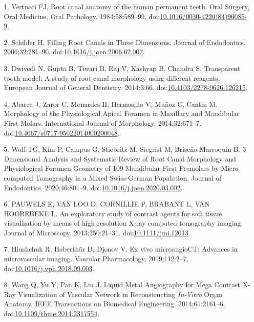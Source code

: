 \documentclass[
  american,
]{article}
\newenvironment{cslreferences}%
  {}%
  {\par}
\begin{document}
\hypertarget{refs}{}
\begin{cslreferences}
\leavevmode\hypertarget{ref-q3HKadWY}{}%
1. Vertucci FJ. Root canal anatomy of the human permanent teeth. Oral Surgery, Oral Medicine, Oral Pathology. 1984;58:589--99. doi:\href{https://doi.org/10.1016/0030-4220(84)90085-9}{10.1016/0030-4220(84)90085-9}.

\leavevmode\hypertarget{ref-AHVImOFB}{}%
2. Schilder H. Filling Root Canals in Three Dimensions. Journal of Endodontics. 2006;32:281--90. doi:\href{https://doi.org/10.1016/j.joen.2006.02.007}{10.1016/j.joen.2006.02.007}.

\leavevmode\hypertarget{ref-11Kln4Lf0}{}%
3. Dwivedi N, Gupta B, Tiwari B, Raj V, Kashyap B, Chandra S. Transparent tooth model: A study of root canal morphology using different reagents. European Journal of General Dentistry. 2014;3:66. doi:\href{https://doi.org/10.4103/2278-9626.126215}{10.4103/2278-9626.126215}.

\leavevmode\hypertarget{ref-gA7iMD0q}{}%
4. Abarca J, Zaror C, Monardes H, Hermosilla V, Muñoz C, Cantin M. Morphology of the Physiological Apical Foramen in Maxillary and Mandibular First Molars. International Journal of Morphology. 2014;32:671--7. doi:\href{https://doi.org/10.4067/s0717-95022014000200048}{10.4067/s0717-95022014000200048}.

\leavevmode\hypertarget{ref-1HkTk4VKM}{}%
5. Wolf TG, Kim P, Campus G, Stiebritz M, Siegrist M, Briseño-Marroquín B. 3-Dimensional Analysis and Systematic Review of Root Canal Morphology and Physiological Foramen Geometry of 109 Mandibular First Premolars by Micro--computed Tomography in a Mixed Swiss-German Population. Journal of Endodontics. 2020;46:801--9. doi:\href{https://doi.org/10.1016/j.joen.2020.03.002}{10.1016/j.joen.2020.03.002}.

\leavevmode\hypertarget{ref-XahGmSLJ}{}%
6. PAUWELS E, VAN LOO D, CORNILLIE P, BRABANT L, VAN HOOREBEKE L. An exploratory study of contrast agents for soft tissue visualization by means of high resolution X-ray computed tomography imaging. Journal of Microscopy. 2013;250:21--31. doi:\href{https://doi.org/10.1111/jmi.12013}{10.1111/jmi.12013}.

\leavevmode\hypertarget{ref-TYAmre95}{}%
7. Hlushchuk R, Haberthür D, Djonov V. Ex vivo microangioCT: Advances in microvascular imaging. Vascular Pharmacology. 2019;112:2--7. doi:\href{https://doi.org/10.1016/j.vph.2018.09.003}{10.1016/j.vph.2018.09.003}.

\leavevmode\hypertarget{ref-6C8eCzkj}{}%
8. Wang Q, Yu Y, Pan K, Liu J. Liquid Metal Angiography for Mega Contrast X-Ray Visualization of Vascular Network in Reconstructing \emph{In-Vitro} Organ Anatomy. IEEE Transactions on Biomedical Engineering. 2014;61:2161--6. doi:\href{https://doi.org/10.1109/tbme.2014.2317554}{10.1109/tbme.2014.2317554}.


\end{cslreferences}
\end{document}
